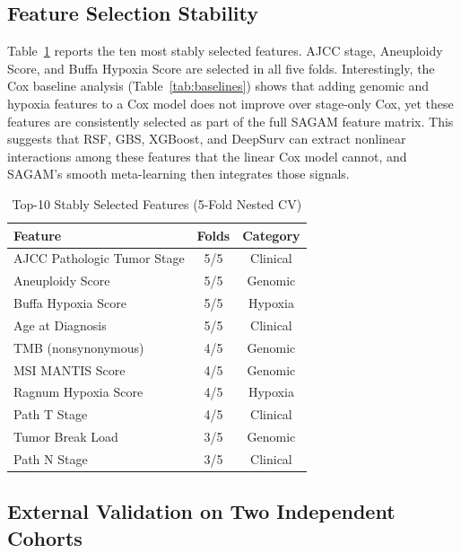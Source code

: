 \documentclass[conference]{IEEEtran}
\begin{document}
\subsection{Feature Selection Stability}

Table~\ref{tab:features} reports the ten most stably selected features.
AJCC stage, Aneuploidy Score, and Buffa Hypoxia Score are selected in all
five folds.
Interestingly, the Cox baseline analysis (Table~\ref{tab:baselines}) shows
that adding genomic and hypoxia features to a Cox model does not improve over
stage-only Cox, yet these features are consistently selected as part of the
full SAGAM feature matrix.
This suggests that RSF, GBS, XGBoost, and DeepSurv can extract nonlinear
interactions among these features that the linear Cox model cannot, and
SAGAM's smooth meta-learning then integrates those signals.

\begin{table}[t]
\caption{Top-10 Stably Selected Features (5-Fold Nested CV)}
\label{tab:features}
\begin{center}
\begin{tabular}{lcc}
\toprule
\textbf{Feature} & \textbf{Folds} & \textbf{Category} \\
\midrule
AJCC Pathologic Tumor Stage    & 5/5 & Clinical \\
Aneuploidy Score               & 5/5 & Genomic \\
Buffa Hypoxia Score            & 5/5 & Hypoxia \\
Age at Diagnosis               & 5/5 & Clinical \\
TMB (nonsynonymous)            & 4/5 & Genomic \\
MSI MANTIS Score               & 4/5 & Genomic \\
Ragnum Hypoxia Score           & 4/5 & Hypoxia \\
Path T Stage                   & 4/5 & Clinical \\
Tumor Break Load               & 3/5 & Genomic \\
Path N Stage                   & 3/5 & Clinical \\
\bottomrule
\end{tabular}
\end{center}
\end{table}

\subsection{External Validation on Two Independent Cohorts}
\end{document}
